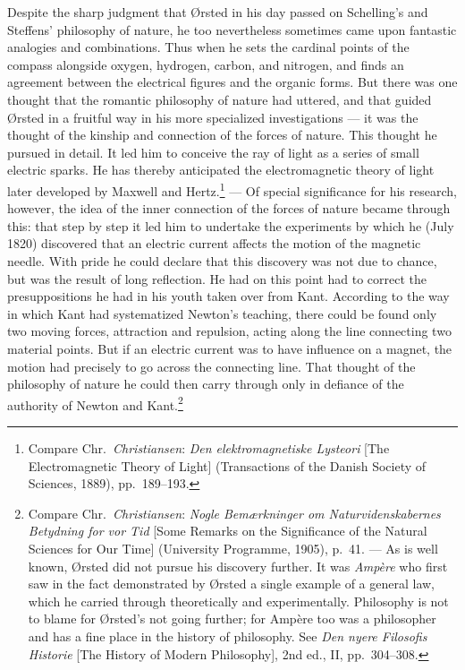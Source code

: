 \documentclass[12pt,a4paper]{book}
\newcommand{\opage}[1]{\marginnote{\footnotesize\textit{[#1]}}}
\begin{document}
Despite the sharp judgment that Ørsted in his day passed on Schelling's and Steffens'
philosophy of nature, he too nevertheless sometimes came upon fantastic analogies and
combinations. Thus when he sets the cardinal points of the compass alongside oxygen,
hydrogen, carbon, and nitrogen, and finds an agreement between the electrical figures
and the organic forms. But there \opage{53}was one thought that the romantic philosophy of
nature had uttered, and that guided Ørsted in a fruitful way in his more specialized
investigations --- it was the thought of the kinship and connection of the forces of
nature. This thought he pursued in detail. It led him to conceive the ray of light as
a series of small electric sparks. He has thereby anticipated the electromagnetic
theory of light later developed by Maxwell and Hertz.\footnote{Compare Chr.\
\emph{Christiansen}: \emph{Den elektromagnetiske Lysteori} [The Electromagnetic Theory of
Light] (Transactions of the Danish Society of Sciences, 1889), pp.~189--193.} --- Of
special significance for his research, however, the idea of the inner connection of
the forces of nature became through this: that step by step it led him to undertake
the experiments by which he (July 1820) discovered that an electric current affects
the motion of the magnetic needle. With pride he could declare that this discovery was
not due to chance, but was the result of long reflection. He had on this point had to
correct the presuppositions he had in his youth taken over from Kant. According to the
way in which Kant had systematized Newton's teaching, there could be found only two
moving forces, attraction and repulsion, acting along the line connecting two material
points. But if an electric current was to have influence on a magnet, the motion had
precisely to go across the connecting line. That thought of the philosophy of nature
he could then carry through only in defiance of the authority of Newton and
Kant.\footnote{Compare Chr.\ \emph{Christiansen}: \emph{Nogle Bemærkninger om
Naturvidenskabernes Betydning for vor Tid} [Some Remarks on the Significance of the
Natural Sciences for Our Time] (University Programme, 1905), p.~41. --- As is well
known, Ørsted did not pursue his discovery further. It was \emph{Ampère} who first saw in the
fact demonstrated by Ørsted a single example of a general law, which he carried
through theoretically and experimentally. Philosophy is not to blame for Ørsted's not
going further; for Ampère too was a philosopher and has a fine place in the history of
philosophy. See \emph{Den nyere Filosofis Historie} [The History of Modern
Philosophy], 2nd ed., II, pp.~304--308.}
\end{document}

